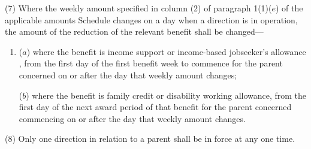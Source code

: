\documentclass[a4paper,12pt]{article}
\begin{document}
(7) Where the weekly amount specified in column (2) of paragraph 1(1)($e$) of the applicable amounts Schedule changes on a day when a direction is in operation, the amount of the reduction of the relevant benefit shall be changed—
\begin{enumerate}\item[]
($a$) where the benefit is income support
or income-based jobseeker’s allowance%
, from the first day of the first benefit week to commence for the parent concerned on or after the day that weekly amount changes;

($b$) where the benefit is family credit or disability working allowance, from the first day of the next award period of that benefit for the parent concerned commencing on or after the day that weekly amount changes.
\end{enumerate}

(8) Only one direction in relation to a parent shall be in force at any one time.

\end{document}
